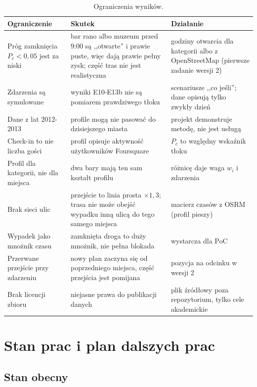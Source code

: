 \documentclass[11pt,a4paper]{article}
\begin{document}
\begin{table}[h]
\centering
\caption{Ograniczenia wyników.}
\begin{tabular}{p{4.2cm}p{5cm}p{5.2cm}}
\toprule
Ograniczenie & Skutek & Działanie \\
\midrule
Próg zamknięcia $P_c < 0{,}05$ jest za niski & bar rano albo muzeum przed 9:00 są ,,otwarte'' i prawie puste, więc dają prawie pełny zysk; część tras nie jest realistyczna & godziny otwarcia dla kategorii albo z OpenStreetMap (pierwsze zadanie wersji 2) \\
Zdarzenia są symulowane & wyniki E10-E13b nie są pomiarem prawdziwego tłoku & scenariusze ,,co jeśli''; dane opisują tylko zwykły dzień \\
Dane z lat 2012-2013 & profile mogą nie pasować do dzisiejszego miasta & projekt demonstruje metodę, nie jest usługą \\
Check-in to nie liczba gości & profil opisuje aktywność użytkowników Foursquare & $P_c$ to względny wskaźnik tłoku \\
Profil dla kategorii, nie dla miejsca & dwa bary mają ten sam kształt profilu & różnicę daje waga $w_i$ i zdarzenia \\
Brak sieci ulic & przejście to linia prosta $\times 1{,}3$; trasa nie może obejść wypadku inną ulicą do tego samego miejsca & macierz czasów z OSRM (profil pieszy) \\
Wypadek jako mnożnik czasu & zamknięta droga to duży mnożnik, nie pełna blokada & wystarcza dla PoC \\
Przerwane przejście przy zdarzeniu & nowy plan zaczyna się od poprzedniego miejsca, część przejścia jest pomijana & pozycja na odcinku w wersji 2 \\
Brak licencji zbioru & niejasne prawa do publikacji danych & plik źródłowy poza repozytorium, tylko cele akademickie \\
\bottomrule
\end{tabular}
\end{table}

\section{Stan prac i plan dalszych prac}

\subsection{Stan obecny}
\end{document}
